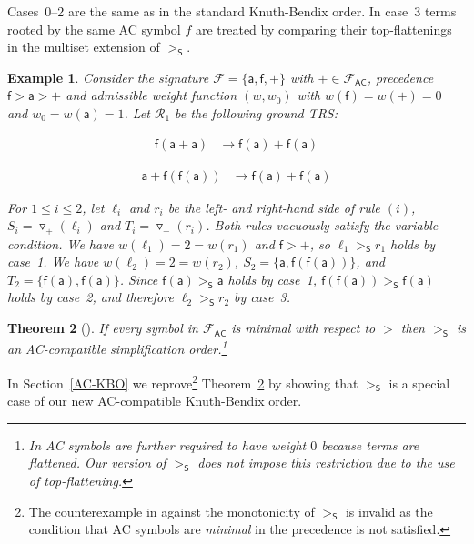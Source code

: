 \documentclass{tlp}
\newtheorem{theorem}{Theorem}[section]
\newtheorem{example}[theorem]{Example}
\newcommand{\tf}[1]{{\triangledown_{\!#1}}}
\newcommand{\m}[1]{\mathsf{#1}}
\newcommand{\mc}[1]{\mathcal{#1}}
\newcommand{\mr}[1]{\mathrm{#1}}
\newcommand{\FF}{\mc{F}}
\newcommand{\AC}{\mr{\m{AC}}}
\newcommand{\steinbach}{\mr{\m{S}}}
\newcommand{\RR}{\mc{R}}
\begin{document}
Cases~0--2 are the same as in the standard Knuth-Bendix order.
In case~3 terms rooted by the same AC symbol $f$ are treated by
comparing their top\hyp flattenings in the multiset extension of
$>_\steinbach$.

\begin{example}
\label{example steinbach}
Consider the signature $\FF = \{ \m{a}, \m{f}, + \}$ with
${+} \in \FF_\AC$, precedence
$\m{f} > \m{a} > +$ 
and admissible weight function $(w,w_0)$ with $w(\m{f}) = w(+) = 0$
and $w_0 = w(\m{a}) = 1$. Let $\RR_1$ be the following ground TRS:
\\[-.5ex]
\begin{minipage}{.45\textwidth}
\begin{align}
\m{f}(\m{a} + \m{a}) &\to \m{f}(\m{a}) + \m{f}(\m{a})
 \tag{1}
\end{align}
\end{minipage}
\hfill
\begin{minipage}{.45\textwidth}
\begin{align}
\m{a} + \m{f}(\m{f}(\m{a})) &\to \m{f}(\m{a}) + \m{f}(\m{a})
 \tag{2}
\end{align}
\end{minipage}

\medskip

\noindent
For $1 \leqslant i \leqslant 2$, let $\ell_i$ and $r_i$ be the
left- and right-hand side of rule $(i)$,
$S_i = \tf{+}(\ell_i)$ and $T_i = \tf{+}(r_i)$.
Both rules vacuously satisfy the variable condition.
We have $w(\ell_1) = 2 = w(r_1)$ and $\m{f} > +$, so
$\ell_1 >_\steinbach r_1$ holds by case~1.
We have $w(\ell_2) = 2 = w(r_2)$,
$S_2 = \{ \m{a}, \m{f}(\m{f}(\m{a})) \}$, 
and $T_2 = \{ \m{f}(\m{a}), \m{f}(\m{a}) \}$. Since
$\m{f}(\m{a}) >_\steinbach \m{a}$ holds by case~1,
$\m{f}(\m{f}(\m{a})) >_\steinbach \m{f}(\m{a})$ holds
by case~2, and therefore $\ell_2 >_\steinbach r_2$ by case~3.
\end{example}

\begin{theorem}[]
\label{thm:Steinbach}
If every symbol in $\FF_\AC$ is minimal with respect to $>$
then $>_\steinbach$ is an AC-compatible simplification order.\footnote{In \cite{S90} AC symbols are further required to have
weight $0$ because terms are flattened.
Our version of $>_\steinbach$ does not impose
this restriction due to the use of top\hyp flattening.}
\end{theorem}

In Section~\ref{AC-KBO} we reprove\footnote{The counterexample in \cite{KV03b} against the monotonicity of
$>_\steinbach$ is invalid as the condition that AC symbols are
\emph{minimal} in the precedence is not satisfied.}
Theorem~\ref{thm:Steinbach}
by showing that $>_\steinbach$ is a special case of
our new AC-compatible Knuth-Bendix order.
\end{document}

